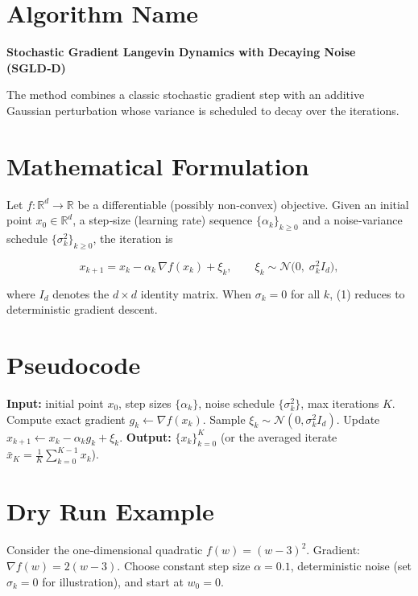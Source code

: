 \documentclass[11pt]{article}
\newcommand{\RR}{\mathbb{R}}
\begin{document}
\section*{Algorithm Name}
\textbf{Stochastic Gradient Langevin Dynamics with Decaying Noise (SGLD‑D)}  

The method combines a classic stochastic gradient step with an additive Gaussian perturbation whose variance is scheduled to decay over the iterations.

\section*{Mathematical Formulation}
Let $f:\RR^{d}\rightarrow\RR$ be a differentiable (possibly non‑convex) objective.  
Given an initial point $x_{0}\in\RR^{d}$, a step‑size (learning rate) sequence $\{\alpha_{k}\}_{k\ge 0}$ and a noise‑variance schedule $\{\sigma_{k}^{2}\}_{k\ge 0}$, the iteration is

\[
\boxed{
x_{k+1}=x_{k}-\alpha_{k}\,\nabla f(x_{k})+\xi_{k},
}
\qquad 
\xi_{k}\sim \mathcal{N}\bigl(0,\;\sigma_{k}^{2} I_{d}\bigr),
\tag{1}
\]

where $I_{d}$ denotes the $d\times d$ identity matrix.  
When $\sigma_{k}=0$ for all $k$, (1) reduces to deterministic gradient descent.

\section*{Pseudocode}
\begin{algorithm}[H]
\caption{SGLD‑D}
\begin{algorithmic}[1]
\State \textbf{Input:} initial point $x_{0}$, step sizes $\{\alpha_{k}\}$, noise schedule $\{\sigma_{k}^{2}\}$, max iterations $K$.
    \State Compute exact gradient $g_{k}\gets \nabla f(x_{k})$.
    \State Sample $\xi_{k}\sim\mathcal{N}(0,\sigma_{k}^{2}I_{d})$.
    \State Update $x_{k+1}\gets x_{k}-\alpha_{k} g_{k}+\xi_{k}$.
\EndFor
\State \textbf{Output:} $\{x_{k}\}_{k=0}^{K}$ (or the averaged iterate $\bar{x}_{K}=\frac1K\sum_{k=0}^{K-1}x_{k}$).
\end{algorithmic}
\end{algorithm}

\section*{Dry Run Example}
Consider the one‑dimensional quadratic $f(w)=(w-3)^{2}$.  
Gradient: $\nabla f(w)=2(w-3)$.  
Choose constant step size $\alpha=0.1$, deterministic noise (set $\sigma_{k}=0$ for illustration), and start at $w_{0}=0$.
\end{document}
